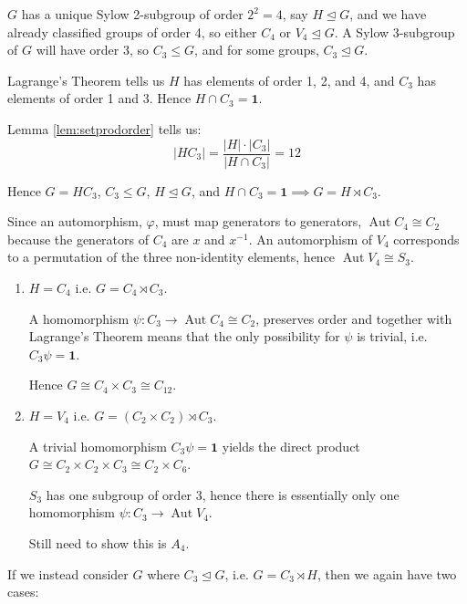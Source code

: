 \documentclass[a4paper, oneside, 12pt, final]{article}
\theoremstyle{definition}
\DeclareMathOperator{\Aut}{Aut}
\begin{document}
\(G\) has a unique Sylow 2-subgroup of order \(2^2 = 4\), say \(H \unlhd G\),
and we have already classified groups of order 4, so either \(C_4\) or \(V_4
\unlhd G\).
A Sylow 3-subgroup of \(G\) will have order 3, so  \(C_3 \leqslant G\), and for
some groups, \(C_3 \unlhd G\).

Lagrange's Theorem tells us \(H\) has elements of order 1, 2, and 4, and
\(C_3\) has elements of order 1 and 3.
Hence \(H \cap C_3 = \bm{1}\).

Lemma \ref{lem:setprodorder} tells us:
\[|H C_3| = \frac{|H| \cdot |C_3|}{|H \cap C_3|} = 12\]

Hence \(G = H C_3\), \(C_3 \leqslant G\), \(H \unlhd G\), and \(H \cap C_3 =
\bm{1} \implies G = H \rtimes C_3\).

Since an automorphism, \(\varphi\), must map generators to generators,
\(\Aut{C_4} \cong C_2\) because the generators of \(C_4\) are \(x\) and
\(x^{-1}\).
An automorphism of \(V_4\) corresponds to a permutation of the three
non-identity elements, hence \(\Aut{V_4} \cong S_3\).

\begin{enumerate}
    \item \(H = C_4\) i.e. \(G = C_4 \rtimes C_3\).

        A homomorphism \(\psi:C_3 \to \Aut{C_4} \cong C_2\), preserves order
        and together with Lagrange's Theorem means that the only possibility
        for \(\psi\) is trivial, i.e. \(C_3\psi = \bm{1}\).

        Hence \(G \cong C_4 \times C_3 \cong C_{12}\).

    \item \(H = V_4\) i.e. \(G = (C_2 \times C_2) \rtimes C_3\).

        A trivial homomorphism \(C_3\psi = \bm{1}\) yields the direct product
        \(G \cong C_2 \times C_2 \times C_3 \cong C_2 \times C_6\).

        \(S_3\) has one subgroup of order 3, hence there is essentially only
        one homomorphism \(\psi:C_3 \to \Aut{V_4}\).

        Still need to show this is \(A_4\).
\end{enumerate}

If we instead consider \(G\) where \(C_3 \unlhd G\), i.e. \(G = C_3 \rtimes
H\), then we again have two cases:
\end{document}
